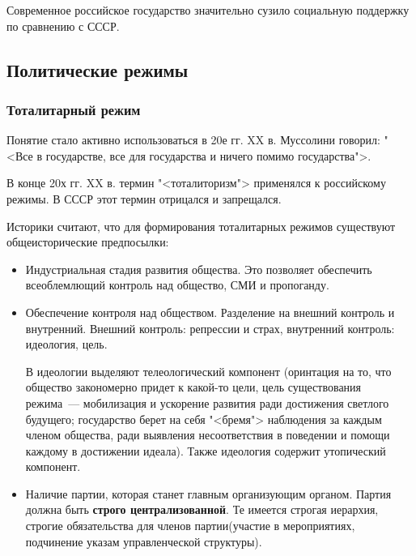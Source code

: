 Современное российское государство значительно сузило социальную поддержку по сравнению с СССР.

\subsection{Политические режимы}
\subsubsection{Тоталитарный режим}
Понятие стало активно использоваться в 20е гг. XX в. Муссолини говорил: "<Все в государстве, все для государства и ничего помимо государства">.

В конце 20х гг. XX в. термин "<тоталиторизм"> применялся к российскому режимы. В СССР этот термин отрицался и запрещался.

Историки считают, что для формирования тоталитарных режимов существуют общеисторические предпосылки:
\begin{itemize}
	\item Индустриальная стадия развития общества. Это позволяет обеспечить всеоблемлющий контроль над общество, СМИ и пропоганду.
	\item Обеспечение контроля над обществом. Разделение на внешний контроль и внутренний. Внешний контроль: репрессии и страх, внутренний контроль: идеология, цель.
	
	В идеологии выделяют телеологический компонент (оринтация на то, что общество закономерно придет к какой-то цели, цель существования режима~--- мобилизация и ускорение развития ради достижения светлого будущего; государство берет на себя "<бремя"> наблюдения за каждым членом общества, ради выявления несоответствия в поведении и помощи каждому в достижении идеала). Также идеология содержит утопический компонент.
	\item Наличие партии, которая станет главным организующим органом. Партия должна быть \textbf{строго централизованной}. Те имеется строгая иерархия, строгие обязательства для членов партии(участие в мероприятиях, подчинение указам управленческой структуры).
\end{itemize}

